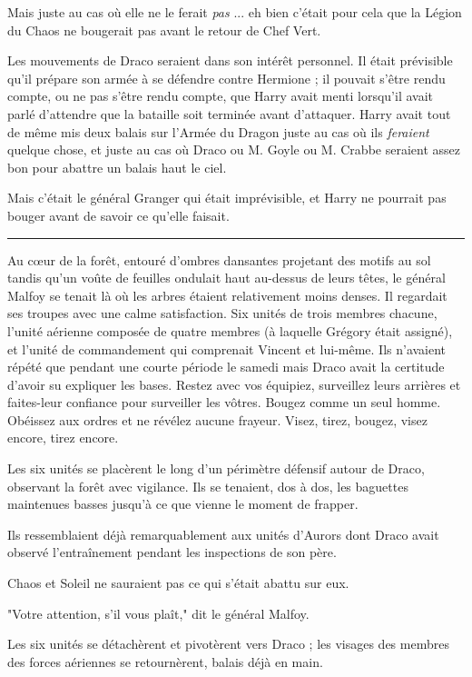Mais juste au cas où elle ne le ferait \emph{pas} ... eh bien c'était pour cela que la Légion du Chaos ne bougerait pas avant le retour de Chef Vert.

Les mouvements de Draco seraient dans son intérêt personnel. Il était prévisible qu'il prépare son armée à se défendre contre Hermione ; il pouvait s'être rendu compte, ou ne pas s'être rendu compte, que Harry avait menti lorsqu'il avait parlé d'attendre que la bataille soit terminée avant d'attaquer. Harry avait tout de même mis deux balais sur l'Armée du Dragon juste au cas où ils \emph{feraient}  quelque chose, et juste au cas où Draco ou M. Goyle ou M. Crabbe seraient assez bon pour abattre un balais haut le ciel.

Mais c'était le général Granger qui était imprévisible, et Harry ne pourrait pas bouger avant de savoir ce qu'elle faisait.
\par\noindent\rule{\textwidth}{0.4pt}
Au cœur de la forêt, entouré d'ombres dansantes projetant des motifs au sol tandis qu'un voûte de feuilles ondulait haut au-dessus de leurs têtes, le général Malfoy se tenait là où les arbres étaient relativement moins denses. Il regardait ses troupes avec une calme satisfaction. Six unités de trois membres chacune, l'unité aérienne composée de quatre membres (à laquelle Grégory était assigné), et l'unité de commandement qui comprenait Vincent et lui-même. Ils n'avaient répété que pendant une courte période le samedi mais Draco avait la certitude d'avoir su expliquer les bases. Restez avec vos équipiez, surveillez leurs arrières et faites-leur confiance pour surveiller les vôtres. Bougez comme un seul homme. Obéissez aux ordres et ne révélez aucune frayeur. Visez, tirez, bougez, visez encore, tirez encore.

Les six unités se placèrent le long d'un périmètre défensif autour de Draco, observant la forêt avec vigilance. Ils se tenaient, dos à dos, les baguettes maintenues basses jusqu'à ce que vienne le moment de frapper.

Ils ressemblaient déjà remarquablement aux unités d'Aurors dont Draco avait observé l'entraînement pendant les inspections de son père.

Chaos et Soleil ne sauraient pas ce qui s'était abattu sur eux.

"Votre attention, s'il vous plaît," dit le général Malfoy.

Les six unités se détachèrent et pivotèrent vers Draco ; les visages des membres des forces aériennes se retournèrent, balais déjà en main.

